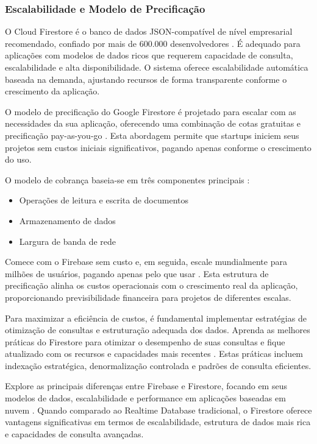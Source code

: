 \subsubsection{Escalabilidade e Modelo de Precificação}

O Cloud Firestore é o banco de dados JSON-compatível de nível empresarial recomendado, confiado por mais de 600.000 desenvolvedores \cite{medium_firestore_overview}. É adequado para aplicações com modelos de dados ricos que requerem capacidade de consulta, escalabilidade e alta disponibilidade. O sistema oferece escalabilidade automática baseada na demanda, ajustando recursos de forma transparente conforme o crescimento da aplicação.

O modelo de precificação do Google Firestore é projetado para escalar com as necessidades da sua aplicação, oferecendo uma combinação de cotas gratuitas e precificação pay-as-you-go \cite{airbyte_firestore_pricing}. Esta abordagem permite que startups iniciem seus projetos sem custos iniciais significativos, pagando apenas conforme o crescimento do uso.

O modelo de cobrança baseia-se em três componentes principais \cite{firebase_pricing}:
\begin{itemize}
	\item Operações de leitura e escrita de documentos
	\item Armazenamento de dados
	\item Largura de banda de rede
\end{itemize}

Comece com o Firebase sem custo e, em seguida, escale mundialmente para milhões de usuários, pagando apenas pelo que usar \cite{firebase_pricing}. Esta estrutura de precificação alinha os custos operacionais com o crescimento real da aplicação, proporcionando previsibilidade financeira para projetos de diferentes escalas.

Para maximizar a eficiência de custos, é fundamental implementar estratégias de otimização de consultas e estruturação adequada dos dados. Aprenda as melhores práticas do Firestore para otimizar o desempenho de suas consultas e fique atualizado com os recursos e capacidades mais recentes \cite{estuary_firestore_best_practices}. Estas práticas incluem indexação estratégica, denormalização controlada e padrões de consulta eficientes.

Explore as principais diferenças entre Firebase e Firestore, focando em seus modelos de dados, escalabilidade e performance em aplicações baseadas em nuvem \cite{airbyte_firebase_vs_firestore}. Quando comparado ao Realtime Database tradicional, o Firestore oferece vantagens significativas em termos de escalabilidade, estrutura de dados mais rica e capacidades de consulta avançadas.

